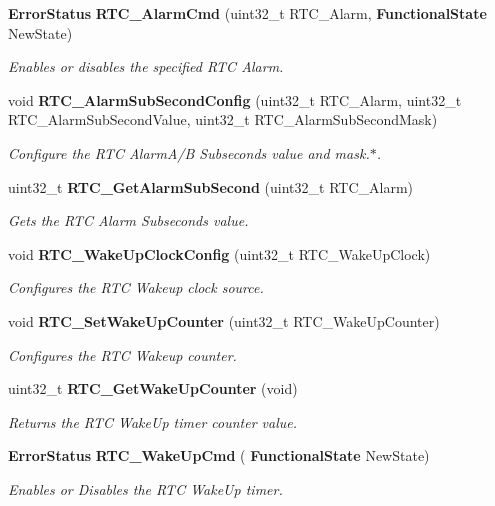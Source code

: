 \begin{DoxyCompactItemize}
\textbf{ Error\+Status} \textbf{ R\+T\+C\+\_\+\+Alarm\+Cmd} (uint32\+\_\+t R\+T\+C\+\_\+\+Alarm, \textbf{ Functional\+State} New\+State)
\begin{DoxyCompactList}\small\item\em Enables or disables the specified R\+TC Alarm. \end{DoxyCompactList}\item 
void \textbf{ R\+T\+C\+\_\+\+Alarm\+Sub\+Second\+Config} (uint32\+\_\+t R\+T\+C\+\_\+\+Alarm, uint32\+\_\+t R\+T\+C\+\_\+\+Alarm\+Sub\+Second\+Value, uint32\+\_\+t R\+T\+C\+\_\+\+Alarm\+Sub\+Second\+Mask)
\begin{DoxyCompactList}\small\item\em Configure the R\+TC Alarm\+A/B Subseconds value and mask.$\ast$. \end{DoxyCompactList}\item 
uint32\+\_\+t \textbf{ R\+T\+C\+\_\+\+Get\+Alarm\+Sub\+Second} (uint32\+\_\+t R\+T\+C\+\_\+\+Alarm)
\begin{DoxyCompactList}\small\item\em Gets the R\+TC Alarm Subseconds value. \end{DoxyCompactList}\item 
void \textbf{ R\+T\+C\+\_\+\+Wake\+Up\+Clock\+Config} (uint32\+\_\+t R\+T\+C\+\_\+\+Wake\+Up\+Clock)
\begin{DoxyCompactList}\small\item\em Configures the R\+TC Wakeup clock source. \end{DoxyCompactList}\item 
void \textbf{ R\+T\+C\+\_\+\+Set\+Wake\+Up\+Counter} (uint32\+\_\+t R\+T\+C\+\_\+\+Wake\+Up\+Counter)
\begin{DoxyCompactList}\small\item\em Configures the R\+TC Wakeup counter. \end{DoxyCompactList}\item 
uint32\+\_\+t \textbf{ R\+T\+C\+\_\+\+Get\+Wake\+Up\+Counter} (void)
\begin{DoxyCompactList}\small\item\em Returns the R\+TC Wake\+Up timer counter value. \end{DoxyCompactList}\item 
\textbf{ Error\+Status} \textbf{ R\+T\+C\+\_\+\+Wake\+Up\+Cmd} (\textbf{ Functional\+State} New\+State)
\begin{DoxyCompactList}\small\item\em Enables or Disables the R\+TC Wake\+Up timer. \end{DoxyCompactList}\item 

\end{DoxyCompactItemize}

